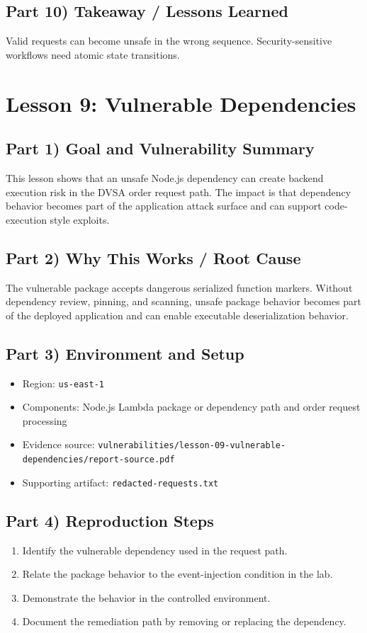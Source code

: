 \documentclass[12pt]{article}
\begin{document}
\subsection*{Part 10) Takeaway / Lessons Learned}
Valid requests can become unsafe in the wrong sequence. Security-sensitive workflows need atomic state transitions.

\clearpage
\section{Lesson 9: Vulnerable Dependencies}

\subsection*{Part 1) Goal and Vulnerability Summary}
This lesson shows that an unsafe Node.js dependency can create backend execution risk in the DVSA order request path. The impact is that dependency behavior becomes part of the application attack surface and can support code-execution style exploits.

\subsection*{Part 2) Why This Works / Root Cause}
The vulnerable package accepts dangerous serialized function markers. Without dependency review, pinning, and scanning, unsafe package behavior becomes part of the deployed application and can enable executable deserialization behavior.

\subsection*{Part 3) Environment and Setup}
\begin{itemize}
\item Region: \texttt{us-east-1}
\item Components: Node.js Lambda package or dependency path and order request processing
\item Evidence source: \texttt{vulnerabilities/lesson-09-vulnerable-dependencies/report-source.pdf}
\item Supporting artifact: \texttt{redacted-requests.txt}
\end{itemize}

\subsection*{Part 4) Reproduction Steps}
\begin{enumerate}
\item Identify the vulnerable dependency used in the request path.
\item Relate the package behavior to the event-injection condition in the lab.
\item Demonstrate the behavior in the controlled environment.
\item Document the remediation path by removing or replacing the dependency.
\end{enumerate}
\end{document}
